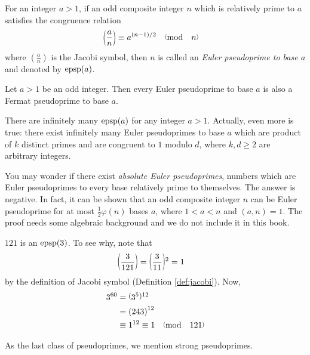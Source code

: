\documentclass{subfile}
\begin{document}
	\begin{definition}\label{def:eulerpseudoprime}
		For an integer $a>1$, if an odd composite integer $n$ which is relatively prime to $a$ satisfies the congruence relation
			\begin{align*}
				\parenthesis{\dfrac{a}{n}}
					& \equiv a^{(n-1)/2} \pmod n
			\end{align*}
		where $\left(\frac{a}{n}\right)$ is the Jacobi symbol, then $n$ is called an \textit{Euler pseudoprime to base $a$} and denoted by $\operatorname{epsp}(a)$.
	\end{definition}

	\begin{corollary}
		Let $a>1$ be an odd integer. Then every Euler pseudoprime to base $a$ is also a Fermat pseudoprime to base $a$.
	\end{corollary}

There are infinitely many $\operatorname{epsp}(a)$ for any integer $a>1$. Actually, even more is true: there exist infinitely many Euler pseudoprimes to base $a$ which are product of $k$ distinct primes and are congruent to $1$ modulo $d$, where $k, d \geq 2$ are arbitrary integers.

You may wonder if there exist \textit{absolute Euler pseudoprimes}, numbers which are Euler pseudoprimes to every base relatively prime to themselves. The answer is negative. In fact, it can be shown that an odd composite integer $n$ can be Euler pseudoprime for at most $\frac{1}{2}\varphi(n)$ bases $a$, where $1<a<n$ and $(a,n)=1$. The proof needs some algebraic background and we do not include it in this book.

	\begin{example}
		$121$ is an $\operatorname{epsp}(3)$. To see why, note that
			\begin{align*}
				\parenthesis{\dfrac{3}{121}}
					& = \parenthesis{\dfrac{3}{11}}^2 = 1
			\end{align*}
		by the definition of Jacobi symbol (Definition \ref{def:jacobi}). Now,
			\begin{align*}
				3^{60}
					& = \parenthesis{3^5}^{12}\\
					& =\left(243\right)^{12}\\
					& \equiv 1^{12} \equiv 1 \pmod{121}
			\end{align*}
	\end{example}

As the last class of pseudoprimes, we mention strong pseudoprimes.
\end{document}
